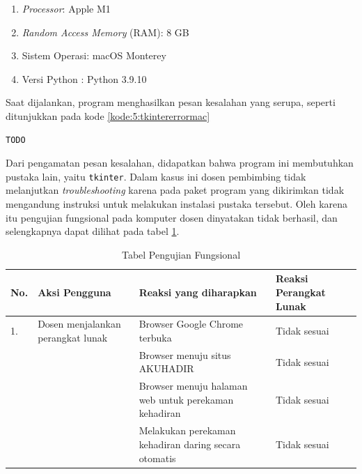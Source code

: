 \begin{enumerate}
	\item \textit{Processor}: Apple M1
	\item \textit{Random Access Memory} (RAM): 8 GB
	\item Sistem Operasi: macOS Monterey
	\item Versi Python : Python 3.9.10
\end{enumerate}

Saat dijalankan, program menghasilkan pesan kesalahan yang serupa, seperti ditunjukkan pada kode \ref{kode:5:tkintererrormac}

\begin{lstlisting}[caption=Pesan kesalahan skrip tanpa \textit{tkinter}) pada komputer alternatif, label=kode:5:tkintererrormac]
TODO
\end{lstlisting}

Dari pengamatan pesan kesalahan, didapatkan bahwa program ini membutuhkan pustaka lain, yaitu \texttt{tkinter}. Dalam kasus ini dosen pembimbing tidak melanjutkan \textit{troubleshooting} karena pada paket program yang dikirimkan tidak mengandung instruksi untuk melakukan instalasi pustaka tersebut. Oleh karena itu pengujian fungsional pada komputer dosen dinyatakan tidak berhasil, dan selengkapnya dapat dilihat pada tabel \ref{tab:fungsidosen}.

\begin{table}[H]			
	\caption{Tabel Pengujian Fungsional}
	\centering
	\begin{tabular}{|p{0.5cm} |p{4cm} |p{5.5cm}| p{3cm}|} \hline
		No. & Aksi Pengguna & Reaksi yang diharapkan & Reaksi Perangkat Lunak\\ \hline     
		1. & Dosen menjalankan perangkat lunak & Browser Google Chrome terbuka & Tidak sesuai\\ \hline 
		 	& &  Browser menuju situs AKUHADIR & Tidak sesuai\\ \hline
		 	& &  Browser menuju halaman web untuk perekaman kehadiran & Tidak sesuai\\ \hline
		 	& &  Melakukan perekaman kehadiran daring secara otomatis & Tidak sesuai\\ \hline
	\end{tabular}
	\label{tab:fungsidosen}
\end{table}


